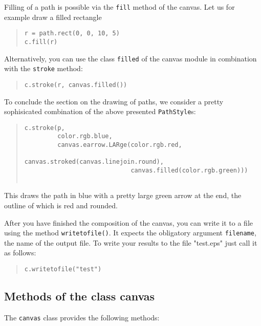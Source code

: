 Filling of a path is possible via the \verb|fill| method of the canvas.
Let us for example draw a filled rectangle 
\begin{quote}
\begin{verbatim}
r = path.rect(0, 0, 10, 5)
c.fill(r)
\end{verbatim}
\end{quote}
Alternatively, you can use the class \verb|filled| of the canvas module
in combination with the \verb|stroke| method:
\begin{quote}
\begin{verbatim}
c.stroke(r, canvas.filled())
\end{verbatim}
\end{quote}

To conclude the section on the drawing of paths, we consider a pretty
sophisicated combination of the above presented \verb|PathStyle|s:
\begin{quote}
\begin{verbatim}
c.stroke(p, 
         color.rgb.blue, 
         canvas.earrow.LARge(color.rgb.red,
                             canvas.stroked(canvas.linejoin.round),
                             canvas.filled(color.rgb.green)))
                                                              
\end{verbatim}
\end{quote}
This draws the path in blue with a pretty large green arrow at the
end, the outline of which is red and rounded.

After you have finished the composition of the canvas, you can
write it to a file using the method \verb|writetofile()|. It expects the
obligatory argument \verb|filename|, the name of the output
file. To write your results to the file "test.eps" just call it as follows:
\begin{quote}
\begin{verbatim}
c.writetofile("test")
\end{verbatim}
\end{quote}


\subsection{Methods of the class canvas}

The \verb|canvas| class provides the following methods:


